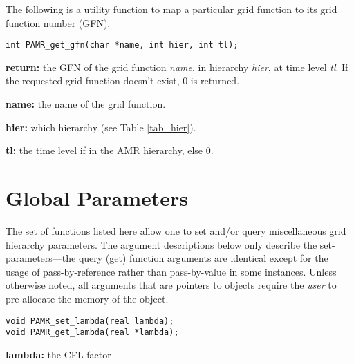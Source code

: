\documentclass[aps,amssymb,unsortedaddress,nofootinbib]{revtex4}
\def\lsep{\itemsep 0.05in}
\begin{document}

The following is a utility function to map a particular grid function to
its grid function number (GFN).

\begin{verbatim}
int PAMR_get_gfn(char *name, int hier, int tl);
\end{verbatim}
\begin{list}{}{\lsep}
\item {\bf return:} the GFN of the grid function
                    {\em name}, in hierarchy {\em hier}, at time level {\em tl}.
                    If the requested grid function doesn't exist, 0 is returned.
\item {\bf *name:} the name of the grid function.
\item {\bf hier:} which hierarchy (see Table \ref{tab_hier}).
\item {\bf tl:} the time level if in the AMR hierarchy, else 0.
\end{list}


\section{Global Parameters}

The set of functions listed here allow one to set and/or query miscellaneous
grid hierarchy parameters. The argument descriptions below only describe the
set-parameters---the query (get) function arguments are identical except
for the usage of pass-by-reference rather than pass-by-value in some instances.
Unless otherwise noted, all arguments that are pointers to objects require
the {\em user} to pre-allocate the memory of the object.


\begin{verbatim}
void PAMR_set_lambda(real lambda);
void PAMR_get_lambda(real *lambda);
\end{verbatim}

\begin{list}{}{\lsep}
\item {\bf lambda:} the CFL factor 
\end{list}

\end{document}

